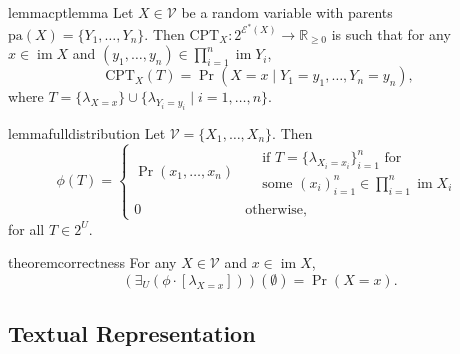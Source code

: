 \documentclass[letterpaper]{article} %
\DeclareMathOperator{\im}{im}
\theoremstyle{definition}
\theoremstyle{remark}
\begin{document}
{\begin{restatable}{lemma}{cptlemma} \label{lemma:cpt}
  Let $X \in \mathcal{V}$ be a random variable with parents $\mathrm{pa}(X) = \{ Y_1,
  \dots, Y_n \}$. Then $\mathrm{CPT}_X\colon 2^{\mathcal{E}^*(X)} \to
  \mathbb{R}_{\ge 0}$ is such that for any $x \in \im X$ and $(y_1, \dots, y_n)
  \in \prod_{i=1}^n \im Y_i$,
  \[
    \mathrm{CPT}_X (T) = \Pr(X = x \mid Y_1 = y_1, \dots, Y_n = y_n),
  \]
  where $T = \{ \lambda_{X=x} \} \cup \{ \lambda_{Y_i=y_i} \mid i = 1, \dots, n
  \}$.
\end{restatable}

\begin{restatable}{lemma}{fulldistribution} \label{lemma:full_distribution}
  Let $\mathcal{V} = \{X_1, \dots, X_n\}$. Then
  \[
    \phi(T) =
    \begin{cases}
      \Pr(x_1, \dots, x_n) &
      \begin{aligned}
        &\text{if } T = \{ \lambda_{X_i=x_i} \}_{i = 1}^n \text{ for} \\
        &\text{some } \textstyle (x_i)_{i=1}^n \in \prod_{i=1}^n \im X_i
      \end{aligned} \\
      0 & \text{otherwise,}
    \end{cases}
  \]
  for all $T \in 2^U$.
\end{restatable}

\begin{restatable}{theorem}{correctness} \label{thm:correctness}
  For any $X \in \mathcal{V}$ and $x \in \im X$,
  \[
    (\exists_U(\phi \cdot [\lambda_{X=x}]))(\emptyset) = \Pr(X = x).
  \]
\end{restatable}

\subsection{Textual Representation} \label{sec:textual_representation}

}
\end{document}
